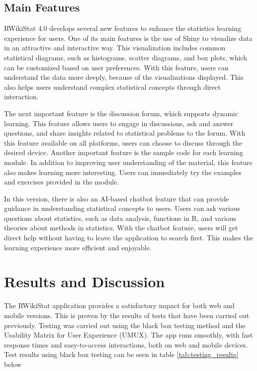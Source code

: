 \documentclass[conference,a4paper]{IEEEtran}
\begin{document}
\subsection{Main Features}
RWikiStat 4.0 develops several new features to enhance the statistics learning
experience for users. One of its main features is the use of Shiny to visualize
data in an attractive and interactive way. This visualization includes common
statistical diagrams, such as histograms, scatter diagrams, and box plots,
which can be customized based on user preferences. With this feature, users can
understand the data more deeply, because of the visualizations displayed. This
also helps users understand complex statistical concepts through direct
interaction.

The next important feature is the discussion forum, which supports dynamic
learning. This feature allows users to engage in discussions, ask and answer
questions, and share insights related to statistical problems to the forum.
With this feature available on all platforms, users can choose to discuss
through the desired device. Another important feature is the sample code for
each learning module. In addition to improving user understanding of the
material, this feature also makes learning more interesting. Users can
immediately try the examples and exercises provided in the module.

In this version, there is also an AI-based chatbot feature that can provide
guidance in understanding statistical concepts to users. Users can ask various
questions about statistics, such as data analysis, functions in R, and various
theories about methods in statistics. With the chatbot feature, users will get
direct help without having to leave the application to search first. This makes
the learning experience more efficient and enjoyable.

\section{Results and Discussion}
\label{sect:results_discussion}

The RWikiStat application provides a satisfactory impact for both web and
mobile versions. This is proven by the results of tests that have been carried
out previously. Testing was carried out using the black box testing method and
the Usability Matrix for User Experience (UMUX). The app runs smoothly, with
fast response times and easy-to-access interactions, both on web and mobile
devices. Test results using black box testing can be seen in table
\ref{tab:testing_results} below
\end{document}
